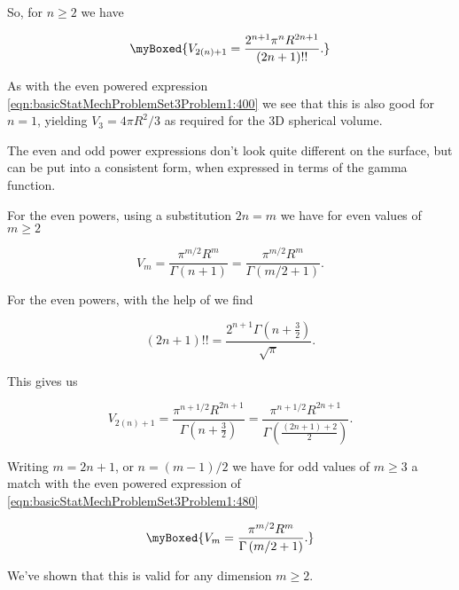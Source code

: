 {So, for $n \ge 2$ we have

\begin{equation}\label{eqn:basicStatMechProblemSet3Problem1:460}
\myBoxed{
V_{2(n)+1} = \frac{2^{n+1} \pi^n R^{2 n + 1}}{(2n +1)!!}.
}
\end{equation}

As with the even powered expression \ref{eqn:basicStatMechProblemSet3Problem1:400} we see that this is also good for $n = 1$, yielding $V_3 = 4 \pi R^2/3$ as required for the 3D spherical volume.

The even and odd power expressions don't look quite different on the surface, but can be put into a consistent form, when expressed in terms of the gamma function.  

For the even powers, using a substitution $2 n = m$ we have for even values of $m \ge 2$

\begin{equation}\label{eqn:basicStatMechProblemSet3Problem1:480}
V_{m} 
= \frac{\pi^{m/2} R^m}{\Gamma(n + 1)}
= \frac{\pi^{m/2} R^m}{\Gamma(m/2 + 1)}.
\end{equation}

For the even powers, with the help of \citep{abramowitz1964handbook} we find

\begin{equation}\label{eqn:basicStatMechProblemSet3Problem1:500}
(2 n + 1)!! = \frac{2^{n+1} \Gamma\left(n + \frac{3}{2}\right)}{\sqrt{\pi}}.
\end{equation}

This gives us

\begin{dmath}\label{eqn:basicStatMechProblemSet3Problem1:520}
V_{2(n)+1} 
= \frac{\pi^{n + 1/2} R^{2 n + 1}}{\Gamma\left(n + \frac{3}{2}\right)}
= \frac{\pi^{n + 1/2} R^{2 n + 1}}{\Gamma\left(\frac{(2 n + 1) + 2}{2}\right)}.
\end{dmath}

Writing $m = 2 n + 1$, or $n = (m - 1)/2$ we have for odd values of $m \ge 3$ a match with the even powered expression of \ref{eqn:basicStatMechProblemSet3Problem1:480}

\begin{equation}\label{eqn:basicStatMechProblemSet3Problem1:540}
\myBoxed{
V_{m} 
= 
\frac{ \pi^{m/2} R^{m} }
{
   \Gamma\left( m/2 + 1 \right)
}.
}
\end{equation}

We've shown that this is valid for any dimension $m \ge 2$.

}
